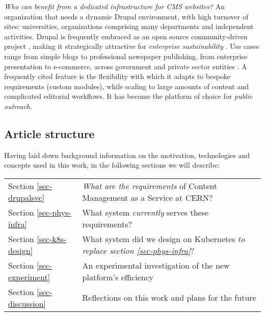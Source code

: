 \emph{Who can benefit from a dedicated infrastructure for CMS websites?}
An organization that needs a dynamic Drupal environment, with high turnover of sites: universities, organizations comprising many departments and independent activities.
Drupal is frequently embraced as an open source community-driven project \cite{buytaertStateDrupalPresentation}, making it strategically attractive for \emph{enterprise sustainability} \cite{cern.genevaRealCostsOpen2019}.
Use cases range from simple blogs to professional newspaper publishing, from enterprise presentation to e-commerce, across government and private sector entities \cite{drupalcommunityExploreFeaturedCase}.
A frequently cited feature is the flexibility with which it adapts to bespoke requirements (custom modules),
while scaling to large amounts of content and complicated editorial workflows.
It has become the platform of choice for \emph{public outreach}.

\subsection{Article structure}

Having laid down background information on the motivation, technologies and concepts used in this work, in the following sections we will describe:

\begin{tabular}{l|l}
    Section \ref{sec-drupalsvc} & \emph{What are the requirements} of Content Management as a Service at CERN?  \\
    Section \ref{sec-phys-infra} & What system \emph{currently} serves these requirements? \\
    Section \ref{sec-k8s-design} & What system did we design on Kubernetes \emph{to replace section \ref{sec-phys-infra}}? \\
    Section \ref{sec-experiment} & An experimental investigation of the new platform's efficiency \\
    Section \ref{sec-discussion} & Reflections on this work and plans for the future \\
\end{tabular}
